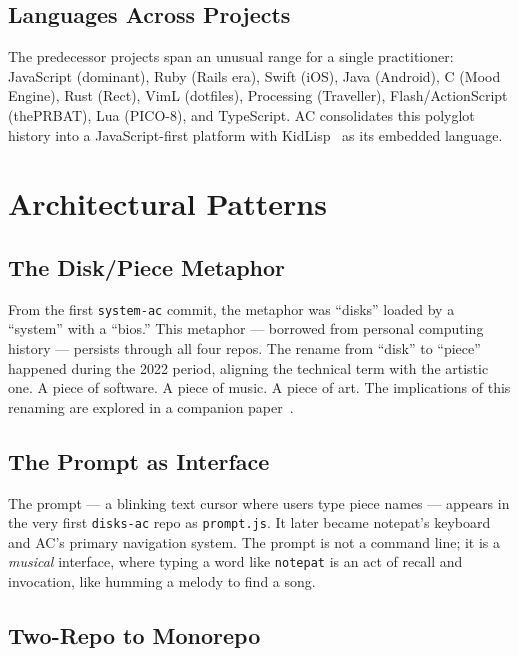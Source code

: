 \documentclass[10pt,letterpaper,twocolumn]{article}
\begin{document}
\subsection{Languages Across Projects}

The predecessor projects span an unusual range for a single practitioner: JavaScript (dominant), Ruby (Rails era), Swift (iOS), Java (Android), C (Mood Engine), Rust (Rect), VimL (dotfiles), Processing (Traveller), Flash/ActionScript (thePRBAT), Lua (PICO-8), and TypeScript. AC consolidates this polyglot history into a JavaScript-first platform with KidLisp~\citep{scudder2026kidlisp} as its embedded language.


\section{Architectural Patterns}

\subsection{The Disk/Piece Metaphor}

From the first \texttt{system-ac} commit, the metaphor was ``disks'' loaded by a ``system'' with a ``bios.'' This metaphor --- borrowed from personal computing history --- persists through all four repos. The rename from ``disk'' to ``piece'' happened during the 2022 period, aligning the technical term with the artistic one. A piece of software. A piece of music. A piece of art. The implications of this renaming are explored in a companion paper~\citep{scudder2026pieces}.

\subsection{The Prompt as Interface}

The prompt --- a blinking text cursor where users type piece names --- appears in the very first \texttt{disks-ac} repo as \texttt{prompt.js}. It later became notepat's keyboard and AC's primary navigation system. The prompt is not a command line; it is a \emph{musical} interface, where typing a word like \texttt{notepat} is an act of recall and invocation, like humming a melody to find a song.

\subsection{Two-Repo to Monorepo}
\end{document}
